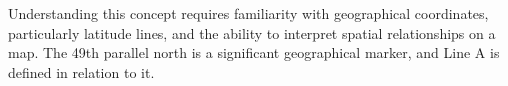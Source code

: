 Understanding this concept requires familiarity with geographical coordinates, particularly latitude lines, and the ability to interpret spatial relationships on a map. The 49th parallel north is a significant geographical marker, and Line A is defined in relation to it.

